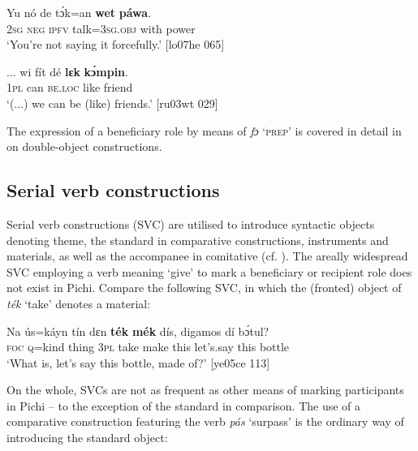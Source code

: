 \ea%
    \label{ex:key:1075}
    \gll Yu  nó  de  tɔ́k=an    \textbf{wet}    \textbf{páwa}.\\
\textsc{2sg}  \textsc{neg}  \textsc{ipfv}  talk=\textsc{3sg.obj}  with    power\\

\glt ‘You’re not saying it forcefully.’ [lo07he 065]
\z


\ea%
    \label{ex:key:1076}
    \gll \op...\cp{}  wi  fít  dé    \textbf{lɛk}  \textbf{kɔ́mpin}.\\
    {} \textsc{1pl}  can  \textsc{be.loc}  like  friend\\

\glt ‘(...) we can be (like) friends.’ [ru03wt 029]
\z

The expression of a beneficiary role by means of \textit{fɔ} ‘\textsc{prep}’ is covered in detail in  on double-object constructions. 

\subsection{Serial verb constructions}\label{sec:9.1.4}

Serial verb constructions (SVC) are utilised to introduce syntactic objects denoting theme, the standard in comparative constructions, instrument\is{}s and materials, as well as the accompanee in comitative (cf. \textsc{).} The areally widespread SVC employing a verb meaning ‘give’ to mark a beneficiary or recipient role does not exist in Pichi. Compare the following SVC, in which the (fronted) object of \textit{ték} ‘take’ denotes a material: 


\ea%
    \label{ex:key:1077}
    \gll Na  ús=káyn  tín    dɛn  \textbf{ték}    \textbf{mék}    dís,  digamos  dí  bɔ́tul?\\
\textsc{foc}  \textsc{q}=kind  thing  \textsc{3pl}  take    make  this  let’s.say  this  bottle\\

\glt ‘What is, let’s say this bottle, made of?’ [ye05ce 113]
\z

On the whole, SVCs are not as frequent as other means of marking participants in Pichi – to the exception of the standard in comparison. The use of a comparative construction featuring the verb \textit{pás} ‘surpass’ is the ordinary way of introducing the standard object:



